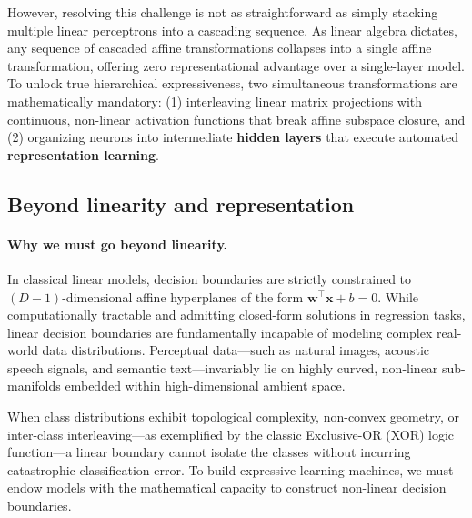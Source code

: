 However, resolving this challenge is not as straightforward as simply stacking multiple linear perceptrons into a cascading sequence. As linear algebra dictates, any sequence of cascaded affine transformations collapses into a single affine transformation, offering zero representational advantage over a single-layer model. To unlock true hierarchical expressiveness, two simultaneous transformations are mathematically mandatory: (1) interleaving linear matrix projections with continuous, non-linear activation functions that break affine subspace closure, and (2) organizing neurons into intermediate \textbf{hidden layers} that execute automated \textbf{representation learning}.

\subsection{Beyond linearity and representation}
\label{sec:continuous_probabilities_softmax}
\label{sec:resolving_xor_hidden_representations}

\paragraph{Why we must go beyond linearity.}
In classical linear models, decision boundaries are strictly constrained to $(D-1)$-dimensional affine hyperplanes of the form $\mathbf{w}^\top \mathbf{x} + b = 0$. While computationally tractable and admitting closed-form solutions in regression tasks, linear decision boundaries are fundamentally incapable of modeling complex real-world data distributions. Perceptual data---such as natural images, acoustic speech signals, and semantic text---invariably lie on highly curved, non-linear sub-manifolds embedded within high-dimensional ambient space. 

When class distributions exhibit topological complexity, non-convex geometry, or inter-class interleaving---as exemplified by the classic Exclusive-OR (XOR) logic function---a linear boundary cannot isolate the classes without incurring catastrophic classification error. To build expressive learning machines, we must endow models with the mathematical capacity to construct non-linear decision boundaries.

